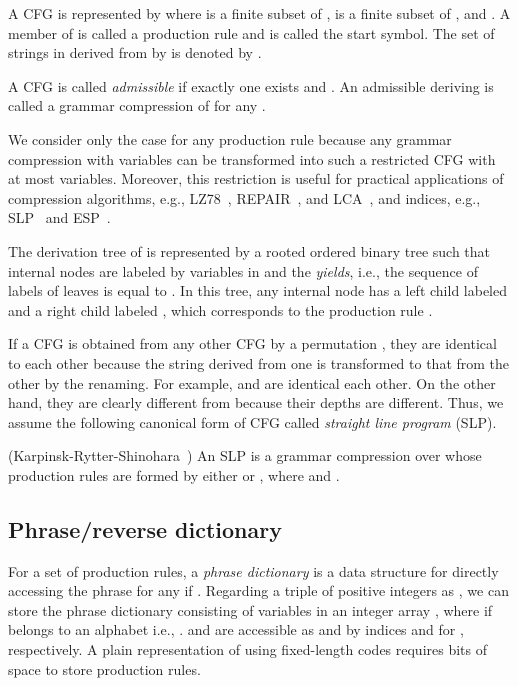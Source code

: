 \documentclass[10pt]{llncs}
\begin{document}
A CFG is represented by  
where  is a finite subset of ,  is a finite subset of 
, and .
A member of  is called a production rule and  is called the start symbol.
The set of strings in  derived from  by  is 
denoted by .

A CFG  is called {\em admissible} if exactly one  exists and .
An admissible  deriving  is called a grammar compression of  for any .

We consider only the case  for any production rule 
because any grammar compression with  variables can be transformed into 
such a restricted CFG with at most  variables.
Moreover, this restriction is useful for practical applications of compression algorithms, e.g.,
LZ78~\cite{LZ78}, REPAIR~\cite{Larsson00}, and LCA~\cite{Maruyama2012},
and indices, e.g., SLP~\cite{Claude09} and ESP~\cite{Maruyama2011}.


The derivation tree of  is represented by a rooted ordered binary tree
such that internal nodes are labeled by variables in  and
the {\em yields}, i.e., the sequence of labels of leaves is equal to .
In this tree, any internal node  has 
a left child labeled  and a right child labeled , which 
corresponds to the production rule .

If a CFG is obtained from any other CFG by a permutation 
, they are identical to each other
because the string derived from one is transformed to 
that from the other by the renaming.
For example,  and
 are identical each other.
On the other hand, they are clearly different from 
 because their depths are different.
Thus, we assume the following canonical form of CFG called 
{\em straight line program} (SLP).

\begin{definition}\label{SLP}(Karpinsk-Rytter-Shinohara~\cite{SLP})
An SLP is a grammar compression over  
whose production rules are formed by either 
 or , where  and .
\end{definition}


\subsection{Phrase/reverse dictionary}
For a set  of production rules,
a {\em phrase dictionary}  is a data structure for directly accessing
 the phrase  for any  if .
Regarding a triple  of positive integers as , 
we can store the phrase dictionary consisting of  variables in an integer array , 
where  if  belongs to an alphabet i.e., . 
 and  are accessible as  and  by indices  and  for , 
respectively. 
A plain representation of  using fixed-length codes requires  bits of space to store 
 production rules.
\end{document}
